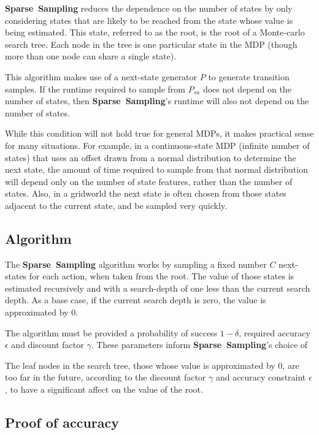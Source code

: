 {\bf Sparse~Sampling} reduces the dependence on the number of states by only considering states that are likely to be reached from the state whose value is being estimated. This state, referred to as the root, is the root of a Monte-carlo search tree. Each node in the tree is one particular state in the MDP (though more than one node can share a single state).

This algorithm makes use of a next-state generator $P$ to generate transition samples. If the runtime required to sample from $P_{sa}$ does not depend on the number of states, then {\bf Sparse~Sampling}'s runtime will also not depend on the number of states.

While this condition will not hold true for general MDPs, it makes practical sense for many situations. For example, in a continuous-state MDP (infinite number of states) that uses an offset drawn from a normal distribution to determine the next state, the amount of time required to sample from that normal distribution will depend only on the number of state features, rather than the number of states. Also, in a gridworld the next state is often chosen from those states adjacent to the current state, and be sampled very quickly.

\subsection{Algorithm}

The {\bf Sparse~Sampling} algorithm works by sampling a fixed number $C$ next-states for each action, when taken from the root. The value of those states is estimated recursively and with a search-depth of one less than the current search depth. As a base case, if the current search depth is zero, the value is approximated by $0$.

The algorithm must be provided a probability of success $1-\delta$, required accuracy $\epsilon$ and discount factor $\gamma$. These parameters inform {\bf Sparse~Sampling}'s choice of 

The leaf nodes in the search tree, those whose value is approximated by $0$, are too far in the future, according to the discount factor $\gamma$ and accuracy constraint $\epsilon$, to have a significant affect on the value of the root.


\subsection{Proof of accuracy}

